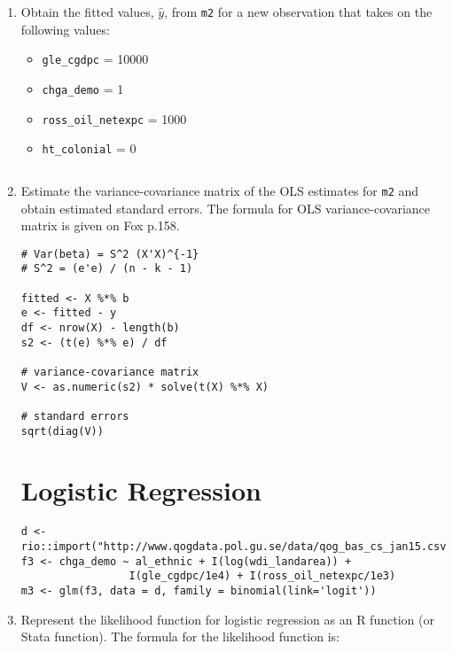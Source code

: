 \documentclass[a4paper,11pt]{article}
\begin{document}
\begin{enumerate}
\item Obtain the fitted values, $\hat{y}$, from \texttt{m2} for a new observation that takes on the following values:

\begin{itemize}
\item \texttt{gle_cgdpc} = 10000
\item \texttt{chga_demo} = 1
\item \texttt{ross_oil_netexpc} = 1000
\item \texttt{ht_colonial} = 0
\end{itemize}

\begin{solution}
\begin{lstlisting}

\end{lstlisting}
\end{solution}

\item Estimate the variance-covariance matrix of the OLS estimates for \texttt{m2} and obtain estimated standard errors. The formula for OLS variance-covariance matrix is given on Fox p.158.

\begin{solution}
\begin{lstlisting}
# Var(beta) = S^2 (X'X)^{-1}
# S^2 = (e'e) / (n - k - 1)

fitted <- X %*% b
e <- fitted - y
df <- nrow(X) - length(b)
s2 <- (t(e) %*% e) / df

# variance-covariance matrix
V <- as.numeric(s2) * solve(t(X) %*% X)

# standard errors
sqrt(diag(V))
\end{lstlisting}
\end{solution}


\clearpage
\section{Logistic Regression}

\begin{lstlisting}
d <- rio::import("http://www.qogdata.pol.gu.se/data/qog_bas_cs_jan15.csv")
f3 <- chga_demo ~ al_ethnic + I(log(wdi_landarea)) + 
                 I(gle_cgdpc/1e4) + I(ross_oil_netexpc/1e3)
m3 <- glm(f3, data = d, family = binomial(link='logit'))
\end{lstlisting}


\item Represent the likelihood function for logistic regression as an R function (or Stata function). The formula for the likelihood function is:


\end{enumerate}
\end{document}
